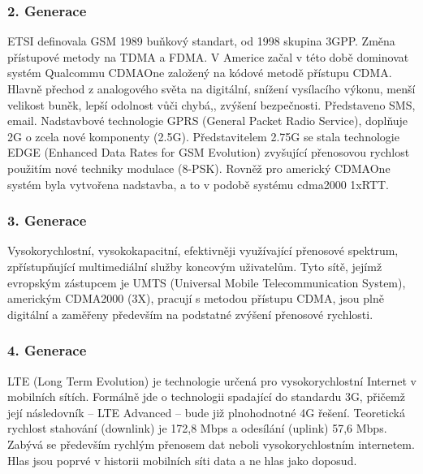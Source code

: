 \subsubsection{2. Generace}
ETSI definovala GSM 1989 buňkový standart, od 1998 skupina 3GPP. Změna přístupové metody na TDMA a FDMA. V Americe začal v této době dominovat systém Qualcommu CDMAOne založený na kódové metodě přístupu CDMA. Hlavně přechod z analogového světa na digitální, snížení vysílacího výkonu, menší velikost buněk, lepší odolnost vůči chybá,, zvýšení bezpečnosti.
Představeno SMS, email.
Nadstavbové technologie GPRS (General Packet Radio Service), doplňuje 2G o zcela nové komponenty (2.5G). Představitelem 2.75G se stala technologie EDGE (Enhanced Data Rates for GSM Evolution) zvyšující přenosovou rychlost použitím nové techniky modulace (8-PSK). Rovněž pro americký CDMAOne systém byla vytvořena nadstavba, a to v podobě systému cdma2000 1xRTT.

\subsubsection{3. Generace}
Vysokorychlostní, vysokokapacitní, efektivněji využívající přenosové spektrum, zpřístupňující multimediální služby koncovým uživatelům. Tyto sítě, jejímž evropským zástupcem je UMTS (Universal Mobile Telecommunication System), americkým CDMA2000 (3X), pracují s metodou přístupu CDMA, jsou plně digitální a zaměřeny především na podstatné zvýšení přenosové rychlosti.

\subsubsection{4. Generace}
LTE (Long Term Evolution) je technologie určená pro vysokorychlostní Internet v mobilních sítích. Formálně jde o technologii spadající do standardu 3G, přičemž její následovník – LTE Advanced – bude již plnohodnotné 4G řešení. Teoretická rychlost stahování (downlink) je 172,8 Mbps a odesílání (uplink) 57,6 Mbps.
Zabývá se především rychlým přenosem dat neboli vysokorychlostním internetem. Hlas jsou poprvé v historii mobilních síti data a ne hlas jako doposud.